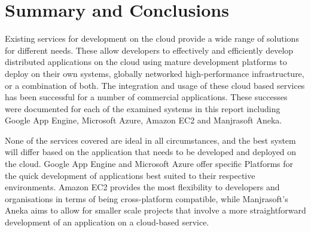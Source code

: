 \chapter{Summary and Conclusions}
Existing services for development on the cloud provide a wide range of
solutions for different needs. These allow developers to effectively and
efficiently develop distributed applications on the cloud using mature
development platforms to deploy on their own systems, globally networked
high-performance infrastructure, or a combination of both. The integration and
usage of these cloud based services has been successful for a number of
commercial applications. These successes were documented for each of the
examined systems in this report including Google App Engine, Microsoft Azure,
Amazon EC2 and Manjrasoft Aneka.

None of the services covered are ideal in all circumstances, and the best
system will differ based on the application that needs to be developed and
deployed on the cloud. Google App Engine and Microsoft Azure offer specific
Platforms for the quick development of applications best suited to their
respective environments. Amazon EC2 provides the most flexibility to
developers and organisations in terms of
being cross-platform compatible, while Manjrasoft's Aneka aims to allow for
smaller scale projects that involve a more straightforward development of an
application on a cloud-based service.
